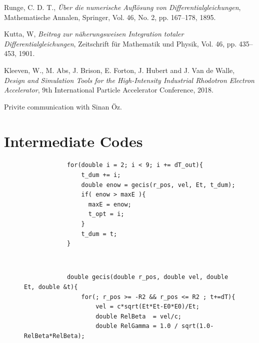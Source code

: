 \documentclass[a4paper,oneside,12pt]{report}
\numberwithin{equation}{chapter}
\begin{document}
{\begin{thebibliography}{9}
    Runge, C. D. T.,
    \emph{Über die numerische Auflösung von Differentialgleichungen}, 
    Mathematische Annalen, 
    Springer, 
    Vol. 46,
    No. 2,
    pp. 167–178,
    1895.

    Kutta, W, 
    \emph{Beitrag zur näherungsweisen Integration totaler Differentialgleichungen}, 
    Zeitschrift für Mathematik und Physik, 
    Vol. 46,
    pp. 435–453,
    1901.

    Kleeven, W., M. Abs, J. Brison, E. Forton, J. Hubert and J. Van de Walle,
    \emph{Design and Simulation Tools for the High-Intensity Industrial Rhodotron Electron Accelerator},
    9th International Particle Accelerator Conference,
    2018.
    
    Privite communication with Sinan Öz.


\end{thebibliography}


\appendix
\chapter{Intermediate Codes} \label{appendix:intermediate_codes}
\begin{figure}[H]
    \centering
    \begin{minipage}{\textwidth}
        \centering
        \begin{verbatim}
            for(double i = 2; i < 9; i += dT_out){
                t_dum += i;
                double enow = gecis(r_pos, vel, Et, t_dum);
                if( enow > maxE ){
                  maxE = enow;
                  t_opt = i;
                }
                t_dum = t;
            }
        \end{verbatim}
    \end{minipage} 
    \\
    \vspace{10pt}
    \begin{minipage}{\textwidth}
        \centering
        \begin{verbatim}
            double gecis(double r_pos, double vel, double Et, double &t){
                for(; r_pos >= -R2 && r_pos <= R2 ; t+=dT){
                    vel = c*sqrt(Et*Et-E0*E0)/Et;
                    double RelBeta  = vel/c;
                    double RelGamma = 1.0 / sqrt(1.0-RelBeta*RelBeta);
                

\end{verbatim}
\end{minipage}
\end{figure}}
\end{document}
